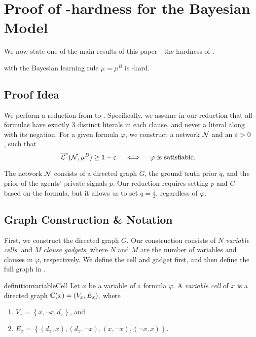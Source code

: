 \section{Proof of \np-hardness for the Bayesian Model}
\label{sec:bayes}

We now state one of the main results of this paper---the hardness of \netlearn{}.

\begin{theorem}[ ]\label{thm:nphardness_bayes}
	\netlearn{} with the Bayesian learning rule $\mu = \mu^B$ is \np-hard.
\end{theorem}

\subsection{Proof Idea}

We perform a reduction from \sat{} to \netlearn{}.
Specifically, we assume in our reduction that all formulas have exactly 3 distinct literals in each clause, and never a literal along with its negation.
For a given formula $ \varphi $, we construct a network $ \mathcal{N} $ and an $ \varepsilon > 0 $, such that
\[
    \overline{\mathcal{L}}^*(\mathcal{N}, \mu^B) \geq 1-\varepsilon \quad \iff \quad \text{$ \varphi $ is satisfiable.}
\]

The network $ \mathcal{N} $ consists of a directed graph $ G $, the ground truth prior $ q $, and the prior of the agents' private signals $ p $.
Our reduction requires setting $ p $ and $ G $ based on the formula, but it allows us to set $ q=\frac 12 $, regardless of $ \varphi $.

\subsection{Graph Construction \& Notation}
\label{ssec:graph}

First, we construct the directed graph $G$.
Our construction consists of $ N $ \emph{variable cells}, and $ M $ \emph{clause gadgets}, where $ N $ and $ M $ are the number of variables and clauses in $ \varphi $, respectively.
We define the cell and gadget first, and then define the full graph in .

\begin{restatable}{definition}{variableCell}
\label{def:cell}
    Let $ x $ be a variable of a formula $ \varphi $.
    A \emph{variable cell} of $ x $ is a directed graph $ \mathbb{C}\!\left(x\right) = \left( V_x, E_x \right) $, where \begin{enumerate}[ ]
    	\item $ V_x = \left\{ x, \lnot x, d_x \right\} $, and
	\item $ E_x = \left\{ \left( d_x, x \right), \left( d_x, \lnot x \right), \left( x, \lnot x \right), \left( \lnot x, x \right) \right\} $.
    \end{enumerate}
\end{restatable}

